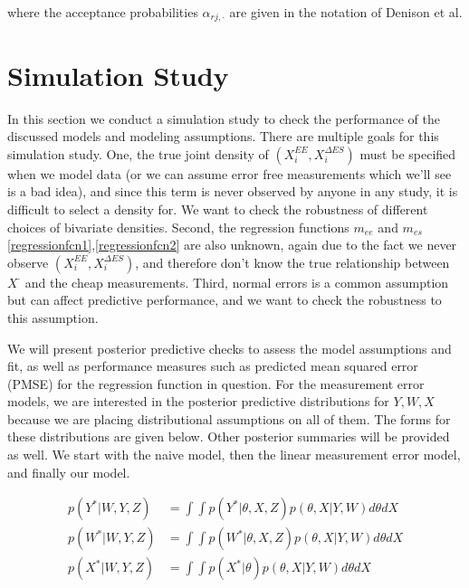 \documentclass[11pt]{article}\usepackage[]{graphicx}\usepackage[]{color}
\begin{document}
where the acceptance probabilities $\alpha_{rj,\cdot}$ are given in the notation of Denison et al.

\section{Simulation Study}

In this section we conduct a simulation study to check the performance of the discussed models and modeling assumptions. There are multiple goals for this simulation study. One, the true joint density of $(X_i^{EE},X_i^{\Delta ES})$ must be specified when we model data (or we can assume error free measurements which we'll see is a bad idea), and since this term is never observed by anyone in any study, it is difficult to select a density for. We want to check the robustness of different choices of bivariate densities. Second, the regression functions $m_{ee}$ and $m_{es}$ \eqref{regressionfcn1},\eqref{regressionfcn2} are also unknown, again due to the fact we never observe $(X_i^{EE},X_i^{\Delta ES})$, and therefore don't know the true relationship between $X^{\cdot}$ and the cheap measurements. Third, normal errors  is a common assumption but  can affect predictive performance, and we want to check the robustness to this assumption.


 We will present posterior predictive checks to assess the model assumptions and fit, as well as performance measures such as predicted mean squared error (PMSE) for the regression function in question. For the measurement error models, we are interested in the posterior predictive distributions for $Y,W,X$ because we are placing distributional assumptions on all of them. The forms for these distributions are given below. Other posterior summaries will be provided as well. We start with the naive model, then the linear measurement error model, and finally our model. 
 
\begin{align}
  \label{ypostpred}
  p(Y^*|W,Y,Z) &= \int \int p(Y^*|\theta,X,Z) p(\theta, X|Y,W) d\theta dX \\
  \label{wpostpred}
  p(W^*|W,Y,Z) &= \int \int p(W^*|\theta,X,Z) p(\theta, X|Y,W) d\theta dX \\
  \label{xpostpred}
  p(X^*|W,Y,Z) &= \int \int p(X^*|\theta) p(\theta, X|Y,W) d\theta dX
\end{align}
\end{document}
